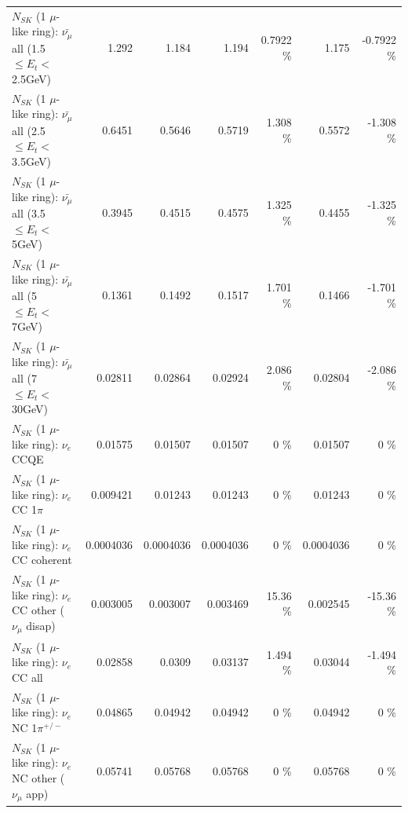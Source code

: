 \begin{table}
\begin{tabular}{| l | r | r | r  r | r  r |}
 $N_{SK}$ (1 $\mu$-like ring): $\bar{\nu_{\mu}}$ all (1.5 $\leq E_{t} <$ 2.5GeV) &           1.292 &           1.184 &           1.194 &   0.7922 \%  &           1.175 &  -0.7922 \%  \\ 
 $N_{SK}$ (1 $\mu$-like ring): $\bar{\nu_{\mu}}$ all (2.5 $\leq E_{t} <$ 3.5GeV) &          0.6451 &          0.5646 &          0.5719 &    1.308 \%  &          0.5572 &   -1.308 \%  \\ 
   $N_{SK}$ (1 $\mu$-like ring): $\bar{\nu_{\mu}}$ all (3.5 $\leq E_{t} <$ 5GeV) &          0.3945 &          0.4515 &          0.4575 &    1.325 \%  &          0.4455 &   -1.325 \%  \\ 
     $N_{SK}$ (1 $\mu$-like ring): $\bar{\nu_{\mu}}$ all (5 $\leq E_{t} <$ 7GeV) &          0.1361 &          0.1492 &          0.1517 &    1.701 \%  &          0.1466 &   -1.701 \%  \\ 
    $N_{SK}$ (1 $\mu$-like ring): $\bar{\nu_{\mu}}$ all (7 $\leq E_{t} <$ 30GeV) &         0.02811 &         0.02864 &         0.02924 &    2.086 \%  &         0.02804 &   -2.086 \%  \\ 
\hline
\hline
\hline
                                      $N_{SK}$ (1 $\mu$-like ring): $\nu_e$ CCQE &         0.01575 &         0.01507 &         0.01507 &        0 \%  &         0.01507 &        0 \%  \\ 
                                 $N_{SK}$ (1 $\mu$-like ring): $\nu_e$ CC 1$\pi$ &        0.009421 &         0.01243 &         0.01243 &        0 \%  &         0.01243 &        0 \%  \\ 
                               $N_{SK}$ (1 $\mu$-like ring): $\nu_e$ CC coherent &       0.0004036 &       0.0004036 &       0.0004036 &        0 \%  &       0.0004036 &        0 \%  \\ 
                $N_{SK}$ (1 $\mu$-like ring): $\nu_e$ CC other ($\nu_\mu$ disap) &        0.003005 &        0.003007 &        0.003469 &    15.36 \%  &        0.002545 &   -15.36 \%  \\ 
                                  $N_{SK}$ (1 $\mu$-like ring): $\nu_{e}$ CC all &         0.02858 &          0.0309 &         0.03137 &    1.494 \%  &         0.03044 &   -1.494 \%  \\ 
\hline
                           $N_{SK}$ (1 $\mu$-like ring): $\nu_e$ NC 1$\pi^{+/-}$ &         0.04865 &         0.04942 &         0.04942 &        0 \%  &         0.04942 &        0 \%  \\ 
                  $N_{SK}$ (1 $\mu$-like ring): $\nu_e$ NC other ($\nu_\mu$ app) &         0.05741 &         0.05768 &         0.05768 &        0 \%  &         0.05768 &        0 \%  \\ 

\end{tabular}
\end{table}
